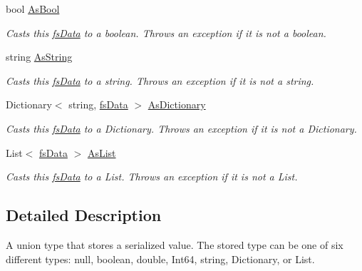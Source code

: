 \begin{DoxyCompactItemize}
bool \hyperlink{class_full_serializer_1_1fs_data_a9e4be12fbd0ac616b08823a6b09529f8}{As\+Bool}
\begin{DoxyCompactList}\small\item\em Casts this \hyperlink{class_full_serializer_1_1fs_data}{fs\+Data} to a boolean. Throws an exception if it is not a boolean. \end{DoxyCompactList}\item 
string \hyperlink{class_full_serializer_1_1fs_data_a69c34ee326b025ae8781eb7029943444}{As\+String}
\begin{DoxyCompactList}\small\item\em Casts this \hyperlink{class_full_serializer_1_1fs_data}{fs\+Data} to a string. Throws an exception if it is not a string. \end{DoxyCompactList}\item 
Dictionary$<$ string, \hyperlink{class_full_serializer_1_1fs_data}{fs\+Data} $>$ \hyperlink{class_full_serializer_1_1fs_data_ad0592f7d7f713ddbf1f89cab77608c57}{As\+Dictionary}
\begin{DoxyCompactList}\small\item\em Casts this \hyperlink{class_full_serializer_1_1fs_data}{fs\+Data} to a Dictionary. Throws an exception if it is not a Dictionary. \end{DoxyCompactList}\item 
List$<$ \hyperlink{class_full_serializer_1_1fs_data}{fs\+Data} $>$ \hyperlink{class_full_serializer_1_1fs_data_aebf459f479691aa88d9712f53a2d85ee}{As\+List}
\begin{DoxyCompactList}\small\item\em Casts this \hyperlink{class_full_serializer_1_1fs_data}{fs\+Data} to a List. Throws an exception if it is not a List. \end{DoxyCompactList}\end{DoxyCompactItemize}


\subsection{Detailed Description}
A union type that stores a serialized value. The stored type can be one of six different types\+: null, boolean, double, Int64, string, Dictionary, or List. 



